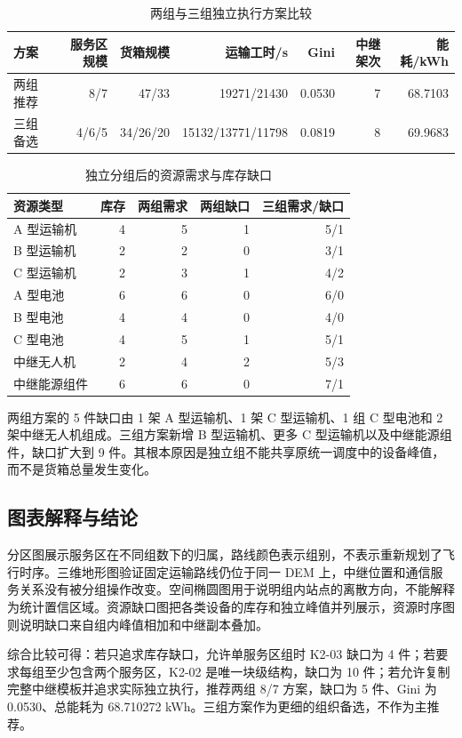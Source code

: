\documentclass[UTF8,a4paper,12pt]{ctexart}
\begin{document}
\begin{table}[H]\centering\caption{两组与三组独立执行方案比较}
\begin{tabular}{lrrrrrr}\toprule
方案&服务区规模&货箱规模&运输工时/s&Gini&中继架次&能耗/kWh\\\midrule
两组推荐&8/7&47/33&19271/21430&0.0530&7&68.7103\\
三组备选&4/6/5&34/26/20&15132/13771/11798&0.0819&8&69.9683\\\bottomrule
\end{tabular}\end{table}

\begin{table}[H]\centering\caption{独立分组后的资源需求与库存缺口}
\begin{tabular}{lrrrr}\toprule
资源类型&库存&两组需求&两组缺口&三组需求/缺口\\\midrule
A 型运输机&4&5&1&5/1\\
B 型运输机&2&2&0&3/1\\
C 型运输机&2&3&1&4/2\\
A 型电池&6&6&0&6/0\\
B 型电池&4&4&0&4/0\\
C 型电池&4&5&1&5/1\\
中继无人机&2&4&2&5/3\\
中继能源组件&6&6&0&7/1\\\bottomrule
\end{tabular}\end{table}

两组方案的 5 件缺口由 1 架 A 型运输机、1 架 C 型运输机、1 组 C 型电池和 2 架中继无人机组成。三组方案新增 B 型运输机、更多 C 型运输机以及中继能源组件，缺口扩大到 9 件。其根本原因是独立组不能共享原统一调度中的设备峰值，而不是货箱总量发生变化。

\subsection{图表解释与结论}
分区图展示服务区在不同组数下的归属，路线颜色表示组别，不表示重新规划了飞行时序。三维地形图验证固定运输路线仍位于同一 DEM 上，中继位置和通信服务关系没有被分组操作改变。空间椭圆图用于说明组内站点的离散方向，不能解释为统计置信区域。资源缺口图把各类设备的库存和独立峰值并列展示，资源时序图则说明缺口来自组内峰值相加和中继副本叠加。

综合比较可得：若只追求库存缺口，允许单服务区组时 K2-03 缺口为 4 件；若要求每组至少包含两个服务区，K2-02 是唯一块级结构，缺口为 10 件；若允许复制完整中继模板并追求实际独立执行，推荐两组 8/7 方案，缺口为 5 件、Gini 为 0.0530、总能耗为 68.710272 kWh。三组方案作为更细的组织备选，不作为主推荐。
\end{document}
